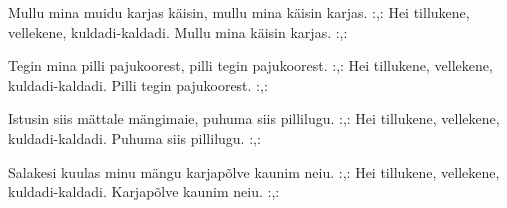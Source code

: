 Mullu mina muidu karjas k\"aisin,
mullu mina k\"aisin karjas.
:,: Hei tillukene, vellekene,
    kuldadi-kaldadi.
    Mullu mina k\"aisin karjas. :,: 

Tegin mina pilli pajukoorest,
pilli tegin pajukoorest.
:,: Hei tillukene, vellekene,
    kuldadi-kaldadi.
    Pilli tegin pajukoorest. :,: 

Istusin siis m\"attale m\"angimaie,
puhuma siis pillilugu.
:,: Hei tillukene, vellekene,
    kuldadi-kaldadi.
    Puhuma siis pillilugu. :,: 

Salakesi kuulas minu m\"angu
karjap\~olve kaunim neiu.
:,: Hei tillukene, vellekene,
    kuldadi-kaldadi.
    Karjap\~olve kaunim neiu. :,: 